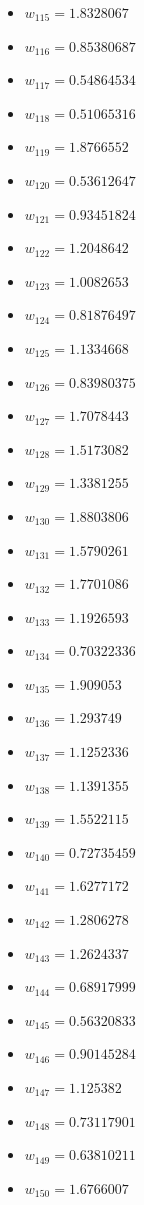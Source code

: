 \documentclass[11pt]{article}
\begin{document}
\begin{itemize}
\item $w_{115} = 1.8328067$
\item $w_{116} = 0.85380687$
\item $w_{117} = 0.54864534$
\item $w_{118} = 0.51065316$
\item $w_{119} = 1.8766552$
\item $w_{120} = 0.53612647$
\item $w_{121} = 0.93451824$
\item $w_{122} = 1.2048642$
\item $w_{123} = 1.0082653$
\item $w_{124} = 0.81876497$
\item $w_{125} = 1.1334668$
\item $w_{126} = 0.83980375$
\item $w_{127} = 1.7078443$
\item $w_{128} = 1.5173082$
\item $w_{129} = 1.3381255$
\item $w_{130} = 1.8803806$
\item $w_{131} = 1.5790261$
\item $w_{132} = 1.7701086$
\item $w_{133} = 1.1926593$
\item $w_{134} = 0.70322336$
\item $w_{135} = 1.909053$
\item $w_{136} = 1.293749$
\item $w_{137} = 1.1252336$
\item $w_{138} = 1.1391355$
\item $w_{139} = 1.5522115$
\item $w_{140} = 0.72735459$
\item $w_{141} = 1.6277172$
\item $w_{142} = 1.2806278$
\item $w_{143} = 1.2624337$
\item $w_{144} = 0.68917999$
\item $w_{145} = 0.56320833$
\item $w_{146} = 0.90145284$
\item $w_{147} = 1.125382$
\item $w_{148} = 0.73117901$
\item $w_{149} = 0.63810211$
\item $w_{150} = 1.6766007$
\end{itemize}
\end{document}
